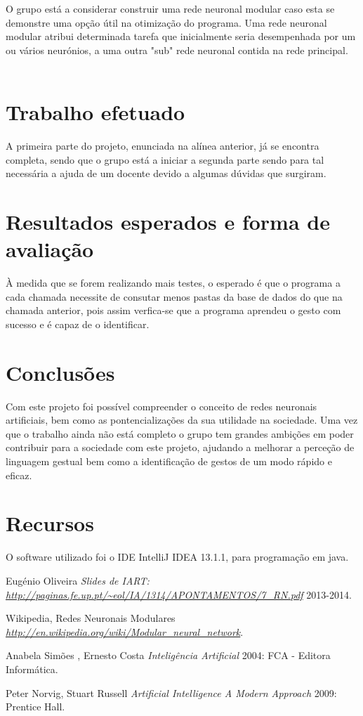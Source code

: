 \documentclass[10pt,a4paper]{article}
\begin{document}
O grupo está a considerar construir uma rede neuronal modular caso esta se demonstre uma opção útil na otimização do programa. Uma rede neuronal modular atribui determinada tarefa que inicialmente seria desempenhada por um ou vários neurónios, a uma outra "sub" rede neuronal contida na rede principal.
\\ \\

\section{Trabalho efetuado}
\subitem

A primeira parte do projeto, enunciada na alínea anterior, já se encontra completa, sendo que o grupo está a iniciar a segunda parte sendo para tal necessária a ajuda de um docente devido a algumas dúvidas que surgiram.


\section{Resultados esperados e forma de avaliação}
\subitem

À medida que se forem realizando mais testes, o esperado é que o programa a cada chamada necessite de consutar menos pastas da base de dados do que na chamada anterior, pois assim verfica-se que a programa aprendeu o gesto com sucesso e é capaz de o identificar.

\section{Conclusões}
\subitem

Com este projeto foi possível compreender o conceito de redes neuronais artificiais, bem como as pontencializações da sua utilidade na sociedade. Uma vez que o trabalho ainda não está completo o grupo tem grandes ambições em poder contribuir para a sociedade com este projeto, ajudando a melhorar a perceção de linguagem gestual bem como a identificação de gestos de um modo rápido e eficaz.

\section{Recursos}

O software utilizado foi o IDE IntelliJ IDEA 13.1.1, para programação em java.


 \begin{thebibliography}{1}

   Eugénio Oliveira {\em Slides de IART: {\url{http://paginas.fe.up.pt/~eol/IA/1314/APONTAMENTOS/7_RN.pdf}}}  2013-2014.
  
   Wikipedia, Redes Neuronais Modulares {\em\url{http://en.wikipedia.org/wiki/Modular_neural_network}}.

   Anabela Simões , Ernesto Costa {\em Inteligência Artificial} 2004: FCA - Editora Informática.
  
   Peter Norvig, Stuart Russell {\em Artificial Intelligence A Modern Approach } 2009: Prentice Hall.
  \end{thebibliography}
  \printindex
\end{document}
